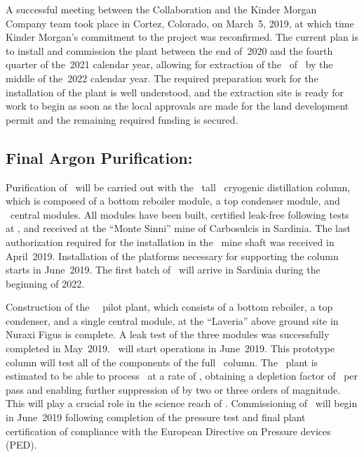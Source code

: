 A successful meeting between the Collaboration and the Kinder Morgan Company team took place in Cortez, Colorado, on March~5, 2019, at which time Kinder Morgan's commitment to the project was reconfirmed.  The current plan is to install and commission the plant between the end of~2020 and the fourth quarter of the~2021 calendar year, allowing for extraction of the \UraniaTotalDSkProduction\ of \UAr\ by the middle of the~2022 calendar year.  The required preparation work for the installation of the plant is well understood, and the extraction site is ready for work to begin as soon as the local approvals are made for the land development permit and the remaining required funding is secured.  


\subsection{Final Argon Purification: \Aria}
\label{sec:Aria}

Purification of \UAr\ will be carried out with the \AriaSeruciHeight\ tall \SeruciOne\ cryogenic distillation column, which is composed of a bottom reboiler module, a top condenser module, and \AriaCentralModulesNumber\ central modules.  
All modules have been built, certified leak-free following tests at \CERN, and received at the ``Monte Sinni'' mine of Carbosulcis in Sardinia.  
The last authorization required for the installation in the \Seruci\ mine shaft was received in April~2019.  
Installation of the platforms necessary for supporting the column starts in June~2019.  
The first batch of \UAr\ will arrive in Sardinia during the beginning of 2022.

Construction of the \AriaNuraxiHeight\ \SeruciZero\ pilot plant, which consists of a bottom reboiler, a top condenser, and a single central module, at the ``Laveria'' above ground site in Nuraxi Figus is complete.  
A leak test of the three modules was successfully completed in May~2019.
\SeruciZero\ will start operations in June~2019.
This prototype column will test all of the components of the full \SeruciOne\ column.
The \SeruciOne\ plant is estimated to be able to process \UAr\ at a rate of \AriaSeruciOneRate, obtaining a  depletion factor of \AriaDepletionPerPass\ per pass and enabling further suppression of  by two or three orders of magnitude. 
This will play a crucial role in the science reach of \DSls. 
Commissioning of \SeruciZero\ will begin in June~2019 following completion of the pressure test and final plant certification of compliance with the European Directive on Pressure devices (PED).

